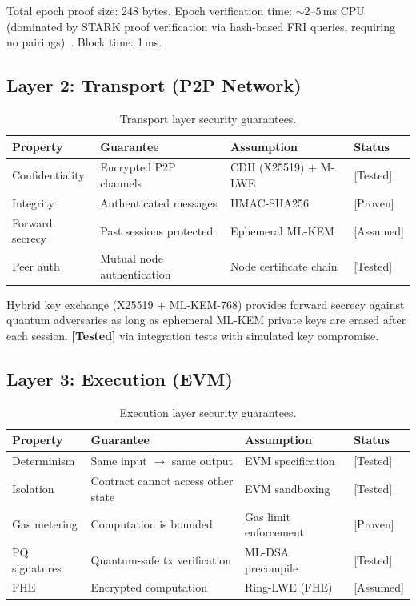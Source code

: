 Total epoch proof size: 248 bytes. Epoch verification time: ${\sim}2$--$5$\,ms CPU
(dominated by STARK proof verification via hash-based FRI queries, requiring no
pairings)~\cite{lux-benchmarks}.
Block time: 1\,ms.

\subsection{Layer 2: Transport (P2P Network)}

\begin{table}[ht]
\centering
\caption{Transport layer security guarantees.}
\label{tab:transport-security}
\begin{tabular}{llll}
\toprule
\textbf{Property} & \textbf{Guarantee} & \textbf{Assumption} & \textbf{Status} \\
\midrule
Confidentiality & Encrypted P2P channels & CDH (X25519) + M-LWE & [Tested] \\
Integrity & Authenticated messages & HMAC-SHA256 & [Proven] \\
Forward secrecy & Past sessions protected & Ephemeral ML-KEM & [Assumed] \\
Peer auth & Mutual node authentication & Node certificate chain & [Tested] \\
\bottomrule
\end{tabular}
\end{table}

Hybrid key exchange (X25519 + ML-KEM-768) provides forward secrecy against quantum
adversaries as long as ephemeral ML-KEM private keys are erased after each session.
\textbf{[Tested]} via integration tests with simulated key compromise.

\subsection{Layer 3: Execution (EVM)}

\begin{table}[ht]
\centering
\caption{Execution layer security guarantees.}
\label{tab:execution-security}
\begin{tabular}{llll}
\toprule
\textbf{Property} & \textbf{Guarantee} & \textbf{Assumption} & \textbf{Status} \\
\midrule
Determinism & Same input $\to$ same output & EVM specification & [Tested] \\
Isolation & Contract cannot access other state & EVM sandboxing & [Tested] \\
Gas metering & Computation is bounded & Gas limit enforcement & [Proven] \\
PQ signatures & Quantum-safe tx verification & ML-DSA precompile & [Tested] \\
FHE & Encrypted computation & Ring-LWE (FHE) & [Assumed] \\
\bottomrule
\end{tabular}
\end{table}

